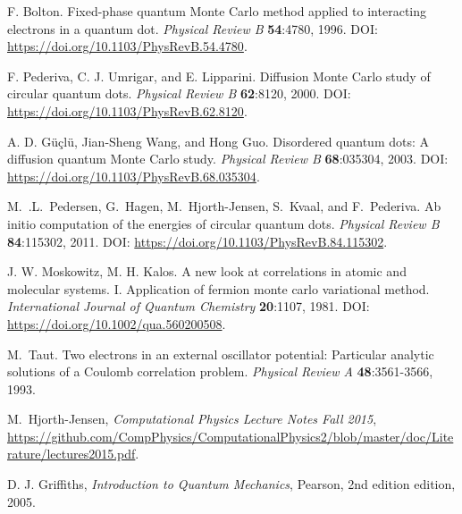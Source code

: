 \documentclass[../main.tex]{subfiles}
\begin{document}
\begin{thebibliography}{99}
 F. Bolton. Fixed-phase quantum Monte Carlo method applied to interacting electrons in
a quantum dot. \emph{Physical Review B} \textbf{54}:4780, 1996. DOI: \url{https://doi.org/10.1103/PhysRevB.54.4780}.

 F. Pederiva, C. J. Umrigar, and E. Lipparini. Diffusion Monte Carlo study of
circular quantum dots. \emph{Physical Review B} \textbf{62}:8120, 2000. DOI: \url{https://doi.org/10.1103/PhysRevB.62.8120}.

 A. D. Güçlü, Jian-Sheng Wang, and Hong Guo. Disordered quantum dots: A diffusion
quantum Monte Carlo study. \emph{Physical Review B} \textbf{68}:035304, 2003. DOI: \url{https://doi.org/10.1103/PhysRevB.68.035304}.

 M.~.L.~Pedersen, G.~Hagen, M.~Hjorth-Jensen, S.~Kvaal, and F.~Pederiva. Ab initio computation of the energies of circular quantum dots. \emph{Physical Review B} {\bf 84}:115302, 2011. DOI: \url{https://doi.org/10.1103/PhysRevB.84.115302}.


 J. W. Moskowitz, M. H. Kalos. A new look at correlations in atomic and molecular systems. I. Application of fermion monte carlo variational method. \emph{International Journal of Quantum Chemistry} \textbf{20}:1107, 1981. DOI: \url{https://doi.org/10.1002/qua.560200508}.

 M.~Taut. Two electrons in an external oscillator potential: Particular analytic solutions
of a Coulomb correlation problem. \emph{Physical Review A} {\bf 48}:3561-3566, 1993.


 M.~Hjorth-Jensen, \emph{Computational Physics Lecture Notes Fall 2015},  \url{https://github.com/CompPhysics/ComputationalPhysics2/blob/master/doc/Literature/lectures2015.pdf}.%

 D. J. Griffiths, \emph{Introduction to Quantum Mechanics}, Pearson,
2nd edition edition, 2005.


\end{thebibliography}
\end{document}
